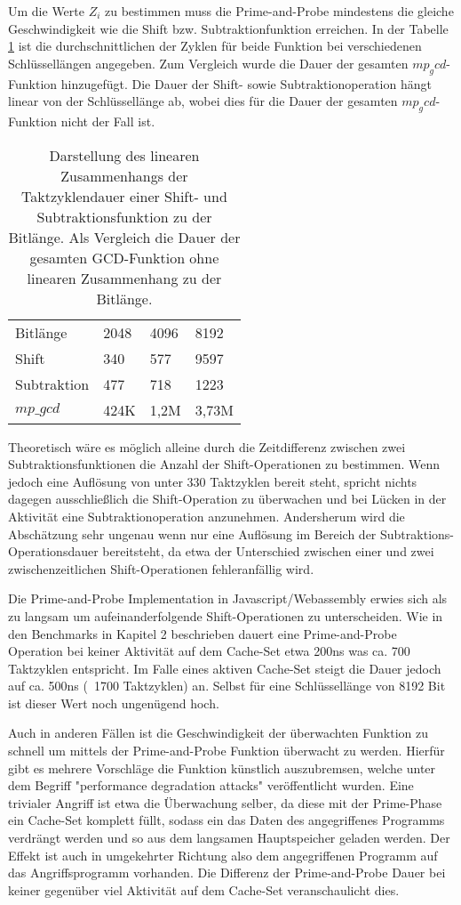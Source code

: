 Um die Werte $Z_i$ zu bestimmen muss die Prime-and-Probe mindestens die gleiche Geschwindigkeit wie die Shift bzw. Subtraktionfunktion erreichen.
In der Tabelle \ref{tbl:ShiftSubCycles} ist die durchschnittlichen der Zyklen für beide Funktion bei verschiedenen Schlüssellängen angegeben. Zum Vergleich wurde die Dauer der gesamten $mp_gcd$-Funktion hinzugefügt.
Die Dauer der Shift- sowie Subtraktionoperation hängt linear von der Schlüssellänge ab, wobei dies für die Dauer der gesamten $mp_gcd$-Funktion nicht der Fall ist.

\begin{table}[h]
\label{tbl:ShiftSubCycles}
\caption{Darstellung des linearen Zusammenhangs der Taktzyklendauer einer Shift- und Subtraktionsfunktion zu der Bitlänge. Als Vergleich die Dauer der gesamten GCD-Funktion ohne linearen Zusammenhang zu der Bitlänge. }
\begin{tabular}{llll}
Bitlänge    & 2048 & 4096 & 8192 \\
Shift       & 340  & 577  & 9597 \\
Subtraktion & 477  & 718  & 1223 \\
$mp\_gcd$    & 424K & 1,2M & 3,73M
\end{tabular}
\end{table}

Theoretisch wäre es möglich alleine durch die Zeitdifferenz zwischen zwei Subtraktionsfunktionen die Anzahl der Shift-Operationen zu bestimmen.
Wenn jedoch eine Auflösung von unter 330 Taktzyklen bereit steht, spricht nichts dagegen ausschließlich die Shift-Operation zu überwachen und bei Lücken in der Aktivität eine Subtraktionoperation anzunehmen.
Andersherum wird die Abschätzung sehr ungenau wenn nur eine Auflösung im Bereich der Subtraktions-Operationsdauer bereitsteht, da etwa der Unterschied zwischen einer und zwei zwischenzeitlichen Shift-Operationen fehleranfällig wird.

Die Prime-and-Probe Implementation in Javascript/Webassembly erwies sich als zu langsam um aufeinanderfolgende Shift-Operationen zu unterscheiden.
Wie in den Benchmarks in Kapitel 2 beschrieben dauert eine Prime-and-Probe Operation bei keiner Aktivität auf dem Cache-Set etwa 200ns was ca. 700 Taktzyklen entspricht.
Im Falle eines aktiven Cache-Set steigt die Dauer jedoch auf ca. 500ns (~1700 Taktzyklen) an.
Selbst für eine Schlüssellänge von 8192 Bit ist dieser Wert noch ungenügend hoch.

Auch in anderen Fällen ist die Geschwindigkeit der überwachten Funktion zu schnell um mittels der Prime-and-Probe Funktion überwacht zu werden.
Hierfür gibt es mehrere Vorschläge die Funktion künstlich auszubremsen, welche unter dem Begriff "performance degradation attacks" veröffentlicht wurden.
Eine trivialer Angriff ist etwa die Überwachung selber, da diese mit der Prime-Phase ein Cache-Set komplett füllt, sodass ein das Daten des angegriffenes Programms verdrängt werden und so aus dem langsamen Hauptspeicher geladen werden.
Der Effekt ist auch in umgekehrter Richtung also dem angegriffenen Programm auf das Angriffsprogramm vorhanden.
Die Differenz der Prime-and-Probe Dauer bei keiner gegenüber viel Aktivität auf dem Cache-Set veranschaulicht dies.

